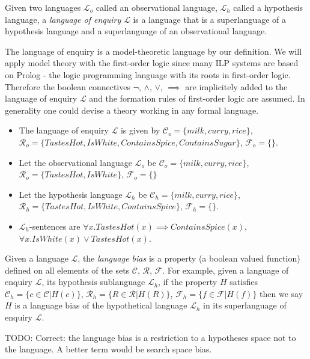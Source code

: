 \begin{defn}
Given two languages $\mathcal{L}_o$ called an observational language, $\mathcal{L}_h$ called a hypothesis language, a \emph{language of enquiry} $\mathcal{L}$ is a language that is a superlanguage of a hypothesis language and a superlanguage of an observational language.
\end{defn}

\begin{remark}
The language of enquiry is a model-theoretic language by our definition. We will apply model theory with the first-order logic since many ILP systems are based on Prolog - the logic programming language with its roots in first-order logic. Therefore the boolean connectives $\neg$, $\land$, $\lor$, $\implies$ are implicitely added to the language of enquiry $\mathcal{L}$ and the formation rules of first-order logic are assumed. In generality one could devise a theory working in any formal language.
\end{remark}

\begin{exmp}
\begin{itemize}
\item The language of enquiry $\mathcal{L}$ is given by $\mathcal{C}_o=\{milk, curry, rice\}$,$\mathcal{R}_o=\{TastesHot, IsWhite, ContainsSpice, ContainsSugar\}$, $\mathcal{F}_o=\{\}$.
\item Let the observational language $\mathcal{L}_o$ be $\mathcal{C}_o=\{milk, curry, rice\}$,\\ $\mathcal{R}_o=\{TastesHot, IsWhite\}$, $\mathcal{F}_o=\{\}$
\item Let the hypothesis language $\mathcal{L}_h$ be $\mathcal{C}_h=\{milk, curry, rice\}$,\\ $\mathcal{R}_h=\{TastesHot, IsWhite, ContainsSpice\}$, $\mathcal{F}_h=\{\}$.
\item $\mathcal{L}_h$-sentences are $\forall x. TastesHot(x) \implies ContainsSpice(x)$,\\ $\forall x. IsWhite(x) \lor TastesHot(x)$.
\end{itemize}
\end{exmp}

\begin{defn}
Given a language $\mathcal{L}$, the \emph{language bias} is a property (a boolean valued function) defined on all elements of the sets $\mathcal{C}$, $\mathcal{R}$, $\mathcal{F}$. For example, given a language of enquiry $\mathcal{L}$, its hypothesis sublanguage $\mathcal{L}_h$, if the property $H$ satisfies $\mathcal{C}_h=\{c \in \mathcal{C} | H(c)\}$, $\mathcal{R}_h=\{R \in \mathcal{R} | H(R)\}$, $\mathcal{F}_h=\{f \in \mathcal{F} | H(f)\}$ then we say $H$ is a language bias of the hypothetical language $\mathcal{L}_h$ in its superlanguage of enquiry $\mathcal{L}$.
\end{defn}
TODO: Correct: the language bias is a restriction to a hypotheses space not to the language. A better term would be search space bias.

